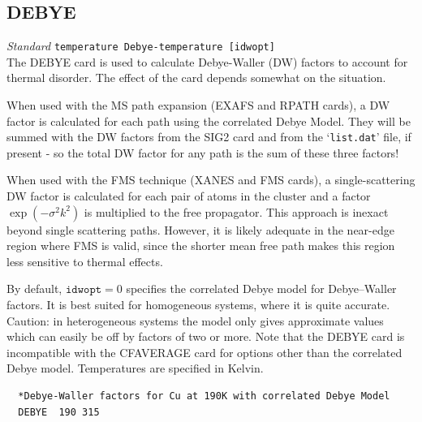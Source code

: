 \documentclass[11pt,oneside]{report} %
\renewcommand{\htmlref}[2]{\hyperlink{#2}{#1}}
\newenvironment{Card}[4]%
      {\vspace{3ex}%
        \subsection{#1}
        \quad\textsl{#3}\newline
        \quad\texttt{#2}\newline%
        \label{card:#4}\\}
      {}
\newcommand{\file}[1]{`\texttt{#1}'}
\renewcommand{\htmlref}[2]{{#1}} %
\begin{document}
\begin{latexonly}
\begin{Card}{DEBYE}{temperature  Debye-temperature [idwopt]}{Standard}{deb2}
  The DEBYE card is used to calculate Debye-Waller (DW) factors to account for thermal disorder.
  The effect of the card depends somewhat on the situation.  
  
  When used with the MS path expansion (EXAFS and RPATH cards), a DW factor is calculated for each
  path using the correlated Debye Model. They will be summed with the 
  DW factors from the \htmlref{SIG2}{card:sig} card and from the \file{list.dat} 
  file, if present - so the total DW factor for any path is the sum of these three factors!
  
  When used with the FMS technique (XANES and FMS cards), a single-scattering DW factor is calculated for each pair of atoms in the cluster and a factor $\exp(-\sigma^2 k^2)$ is multiplied to the free propagator.  This approach is inexact beyond single scattering paths.  However, it is likely adequate in the near-edge region where FMS is valid, since the shorter mean free path makes this region less sensitive to thermal effects.
  
  By default, $\mathtt{idwopt}=0$ specifies the correlated Debye model 
 for Debye--Waller factors. It is best suited for
  homogeneous systems, where it is quite accurate. Caution: in
  heterogeneous systems the model only gives approximate values which
  can easily be off by factors of two or more.
  Note that the DEBYE card is incompatible with the 
  \htmlref{CFAVERAGE}{card:cfa} card for options other than the correlated Debye 
  model. Temperatures are specified in Kelvin.

\begin{verbatim}
  *Debye-Waller factors for Cu at 190K with correlated Debye Model
  DEBYE  190 315
\end{verbatim}



\end{Card}
\end{latexonly}
\end{document}
